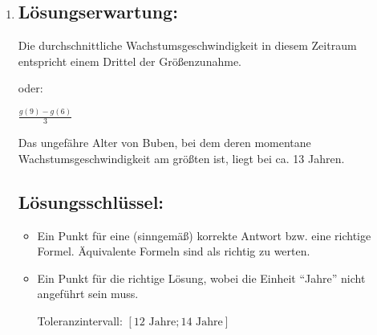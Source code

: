 \begin{langesbeispiel}
{\begin{enumerate}
Stichprobenanteil: 0,9

Anteil laut Diagramm: 0,94

Unterschied: 4 Prozentpunkte\leer

Mögliche Berechnung:

$0,9465=0,9+1,96\cdot\sqrt{\dfrac{0,9\cdot (1-0,9)}{n}}\Rightarrow\approx 160$ Buben
\subsection{Lösungsschlüssel:}
\begin{itemize}
	\item Ein Punkt für die richtige Lösung.
	\item Ein Punkt für die richtige Lösung.
	
	Toleranzintervall: $[155\text{ Buben};165\text{ Buben}]$
	
	Die Aufgabe ist auch dann als richtig gelöst zu werten, wenn bei korrektem Ansatz das Ergebnis aufgrund eines Rechenfehlers nicht richtig ist.
\end{itemize}

	\item \subsection{Lösungserwartung:}

Die durchschnittliche Wachstumsgeschwindigkeit in diesem Zeitraum entspricht einem Drittel der Größenzunahme.

oder:

$\frac{g(9)-g(6)}{3}$\leer

Das ungefähre Alter von Buben, bei dem deren momentane Wachstumsgeschwindigkeit am größten ist, liegt bei ca. 13 Jahren.

\subsection{Lösungsschlüssel:}
\begin{itemize}
	\item Ein Punkt für eine (sinngemäß) korrekte Antwort bzw. eine richtige Formel. Äquivalente Formeln sind als richtig zu werten.	
	\item Ein Punkt für die richtige Lösung, wobei die Einheit "`Jahre"' nicht angeführt sein muss.
	
	Toleranzintervall: $[12\text{ Jahre};14\text{ Jahre}]$
\end{itemize}


\end{enumerate}}
\end{langesbeispiel}
